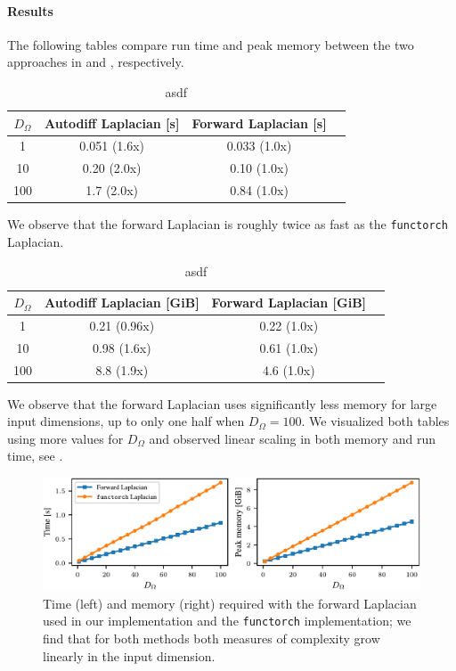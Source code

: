 \paragraph{Results} 
The following tables compare run time and peak memory between the two approaches in  and , respectively. 
\begin{table}[h]
  \label{app:table:comparison-memory}
  \begin{center}
    \begin{tabular}{cccc}
      \toprule
      $D_{\Omega}$ & \textbf{Autodiff Laplacian [s]} & \textbf{Forward Laplacian [s]} \\
      \midrule
      1   & 0.051 (1.6x) & 0.033 (1.0x) \\
      10  & 0.20 (2.0x)  & 0.10 (1.0x)  \\
      100 & 1.7 (2.0x)   & 0.84 (1.0x)  \\
      \bottomrule
    \end{tabular}
  \end{center}
  \caption{asdf}
\end{table}
We observe that the forward Laplacian is roughly twice as fast as the \texttt{functorch} Laplacian. 
\begin{table}[h]
  \label{app:table:comparison-runtimes}
  \begin{center}
    \begin{tabular}{cccc}
      \toprule
      $D_{\Omega}$ & \textbf{Autodiff Laplacian [GiB]} & \textbf{Forward Laplacian [GiB]} \\
      \midrule
      1   & 0.21 (0.96x) & 0.22 (1.0x) \\
      10  & 0.98 (1.6x)  & 0.61 (1.0x) \\
      100 & 8.8 (1.9x)   & 4.6 (1.0x)  \\
      \bottomrule
      \end{tabular}
  \end{center}
  \caption{asdf}
\end{table}
We observe that the forward Laplacian uses significantly less memory for large input dimensions, up to only one half when $D_\Omega=100$.
We visualized both tables using more values for $D_\Omega$ and observed linear scaling in both memory and run time, see .

\begin{figure}[h]
  \centering
  \includegraphics[width=\linewidth]{../figures/laplacian_benchmark.pdf}
  \caption{Time (left) and memory (right) required with the forward Laplacian used in our implementation and the \texttt{functorch} implementation; we find that for both methods both measures of complexity grow linearly in the input dimension.}
  \label{app:fig:comparison}
\end{figure}

